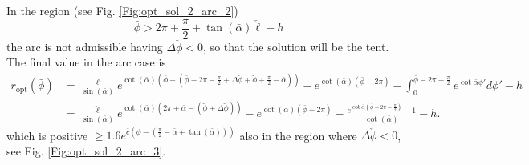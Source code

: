 \documentclass[reqno]{amsart}
\theoremstyle{definition} \newtheorem{definition}{Definition}[section]
\theoremstyle{definition} \newtheorem{remark}[definition]{Remark}
\theoremstyle{plain} \newtheorem{lemma}[definition]{Lemma}
\theoremstyle{plain} \newtheorem{proposition}[definition]{Proposition}
\theoremstyle{plain} \newtheorem{theorem}[definition]{Theorem}
\theoremstyle{plain} \newtheorem{corollary}[definition]{Corollary}
\theoremstyle{definition} \newtheorem{example}[definition]{Example}
\theoremstyle{plain} \newtheorem{claim}[clai]{Claim}
\theoremstyle{definition} \newtheorem{assumption}[definition]{Assumption}
\theoremstyle{definition} \newtheorem{observation}[definition]{Observation}
\newcommand{\1}{\mathbbm 1}
\numberwithin{equation}{section} %
\theoremstyle{plain} \newtheorem*{theorem*}{Theorem}
\theoremstyle{plain} \newtheorem{mthm}[maintheorem]{Main Theorem}
\theoremstyle{plain} \newtheorem*{mthm*}{Main Theorem}
\theoremstyle{plain} \newtheorem*{conjecture*}{Conjecture}
\theoremstyle{plain} \newtheorem{conjecture}[definition]{Conjecture}
\theoremstyle{plain} \newtheorem*{problem*}{Problem}
\begin{document}
In the region (see Fig. \ref{Fig:opt_sol_2_arc_2})
\begin{equation}
\label{Equa:opt_sol_2_arc_2}
\bar \phi > 2\pi + \frac{\pi}{2} + \tan(\bar \alpha) \check \ell - h
\end{equation}
the arc is not admissible having $\Delta \check \phi < 0$, so that the solution will be the tent. The final value in the arc case is
\begin{equation}
\label{Equa:opt_sol_3_finarc}
\begin{split}
r_\mathrm{opt}(\bar \phi) &= \frac{\check \ell}{\sin(\bar \alpha)} e^{\cot(\bar \alpha) (\bar \phi - (\bar \phi - 2\pi - \frac{\pi}{2} + \Delta \check \phi + \check \phi + \frac{\pi}{2} - \bar \alpha))} - e^{\cot(\bar \alpha)(\bar \phi - 2\pi)} - \int_0^{\bar \phi - 2\pi - \frac{\pi}{2}} e^{\cot{\bar \alpha} \phi'} d\phi' - h \\
&= \frac{\check \ell}{\sin(\bar \alpha)} e^{\cot(\bar \alpha) (2\pi + \bar \alpha - (\check \phi + \Delta \check \phi))} - e^{\cot(\bar \alpha)(\bar \phi - 2\pi)} - \frac{e^{\cot{\bar \alpha} (\bar \phi - 2\pi - \frac{\pi}{2})}-1}{\cot(\bar \alpha)} - h.
\end{split}
\end{equation}
which is positive $\geq 1.6 e^{\bar c(\bar \phi - (\frac{\pi}{2} - \bar \alpha + \tan(\bar \alpha)))}$ also in the region where $\Delta \check \phi < 0$, see Fig. \ref{Fig:opt_sol_2_arc_3}.
\end{document}
